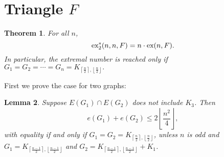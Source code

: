 \documentclass[12pt]{report}
\newtheorem{theorem}{Theorem}[chapter]
\newtheorem{lemma}[theorem]{Lemma}
\newcommand*{\ex}{\textnormal{ex}}
\newcommand*{\dexind}{\textnormal{ex}_2^*}
\begin{document}
\section{Triangle $F$}

\begin{theorem}
  For all $n$,
  \[
    \dexind(n, n, F) = n \cdot \ex(n, F).
  \]
  In particular, the extremal number is reached only if $G_1 = G_2 = \cdots = G_n = K_{\left\lceil\frac{n}{2}\right\rceil, \left\lfloor\frac{n}{2}\right\rfloor}.$
\end{theorem}

First we prove the case for two graphs:

\begin{lemma}
  Suppose $E(G_1) \cap E(G_2)$ does not include $K_3$. Then
  \[
    e(G_1) + e(G_2) \leq 2\left\lfloor\frac{n^2}{4}\right\rfloor,
  \]
  with equality if and only if $G_1 = G_2 = K_{\left\lceil\frac{n}{2}\right\rceil, \left\lfloor\frac{n}{2}\right\rfloor}$, unless $n$ is odd and $G_1 = K_{\left\lceil\frac{n - 1}{2}\right\rceil, \left\lfloor\frac{n - 1}{2}\right\rfloor}$ and $G_2 = K_{\left\lceil\frac{n - 1}{2}\right\rceil, \left\lfloor\frac{n - 1}{2}\right\rfloor} + K_1$.
\end{lemma}
\end{document}
